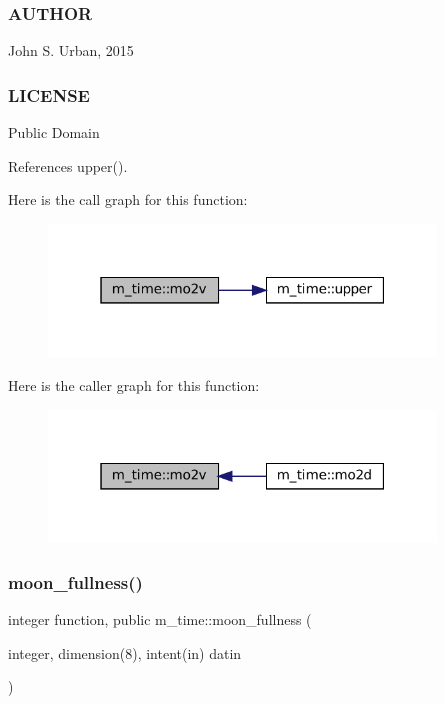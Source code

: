 \subsubsection*{A\+U\+T\+H\+OR}

John S. Urban, 2015 \subsubsection*{L\+I\+C\+E\+N\+SE}

Public Domain 

References upper().

Here is the call graph for this function\+:\nopagebreak
\begin{figure}[H]
\begin{center}
\leavevmode
\includegraphics[width=292pt]{namespacem__time_ad7bf0886754757e8961e562f06cf3bb7_cgraph}
\end{center}
\end{figure}
Here is the caller graph for this function\+:\nopagebreak
\begin{figure}[H]
\begin{center}
\leavevmode
\includegraphics[width=292pt]{namespacem__time_ad7bf0886754757e8961e562f06cf3bb7_icgraph}
\end{center}
\end{figure}
\mbox{\label{namespacem__time_a702b39998a769b8f60070c0bec975ee2}} 
\subsubsection{\texorpdfstring{moon\+\_\+fullness()}{moon\_fullness()}}
{\footnotesize\ttfamily integer function, public m\+\_\+time\+::moon\+\_\+fullness (\begin{DoxyParamCaption}\item[{integer, dimension(8), intent(in)}]{datin }\end{DoxyParamCaption})}



